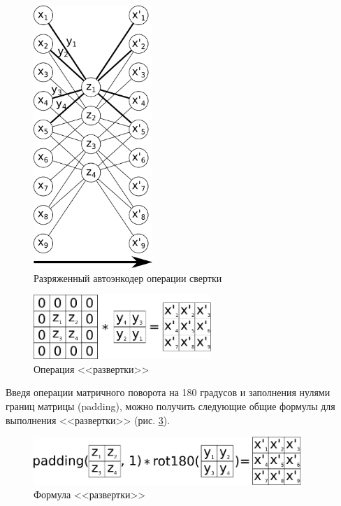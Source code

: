 \begin{figure}[H]
  \centering
  \includegraphics[width=0.4\textwidth]{man-source/images/ch2/pic2-5.png}
  \caption{Разряженный автоэнкодер операции свертки}
  \label{fig:convolution_autoencoder}
\end{figure}

\begin{figure}[H]
  \centering
  \includegraphics[width=0.6\textwidth]{man-source/images/ch2/pic2-6.png}
  \caption{Операция <<развертки>>}
  \label{fig:deconvolution}
\end{figure}

Введя операции матричного поворота на 180 градусов и заполнения нулями границ матрицы (padding), можно получить следующие общие формулы для выполнения <<развертки>> (рис. \ref{fig:deconvolution_formula}).

\begin{figure}[H]
  \centering
  \includegraphics[width=0.9\textwidth]{man-source/images/ch2/pic2-9.png}
  \caption{Формула <<развертки>>}
  \label{fig:deconvolution_formula}
\end{figure}

